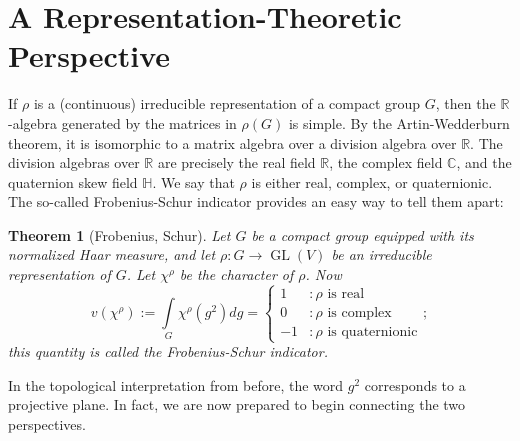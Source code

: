 \documentclass[12pt]{article}
\newtheorem{thm}{Theorem}[section]
\newcommand{\R}{\mathbb{R}}
\newcommand{\C}{\mathbb{C}}
\newcommand{\Hq}{\mathbb{H}}
\newcommand{\Ha}{\mathbb{H}}
\DeclareMathOperator{\End}{End}
\newcommand{\be}{\begin{equation}}
\newcommand{\ee}{\end{equation}}
\DeclareMathOperator{\GL}{GL}
\begin{document}
\section{A Representation-Theoretic Perspective}

If $\rho$ is a (continuous) irreducible representation of a compact group $G$, then the $\R$-algebra generated by the matrices in $\rho(G)$ is simple.  By the Artin-Wedderburn theorem, it is isomorphic to a matrix algebra over a division algebra over $\R$.  The division algebras over $\R$ are precisely the real field $\R$, the complex field $\C$, and the quaternion skew field $\Ha$.  We say that $\rho$ is either real, complex, or quaternionic.  The so-called Frobenius-Schur indicator provides an easy way to tell them apart:

\begin{thm}[Frobenius, Schur]
Let $G$ be a compact group equipped with its normalized Haar measure, and let $\rho : G \to \GL(V)$ be an irreducible representation of $G$. Let $\chi^\rho$ be the character of $\rho$.  Now
\be 
v(\chi^\rho) := \int \limits_G \chi^\rho(g^2) dg  = \left\{
     \begin{array}{ll}
       1  & : \rho \mbox{ is real} \\
       0  & : \rho \mbox{ is complex} \\
       -1 & : \rho \mbox{ is quaternionic}
     \end{array};
   \right.
\ee
this quantity is called the Frobenius-Schur indicator.
\end{thm}
In the topological interpretation from before, the word $g^2$ corresponds to a projective plane.  In fact, we are now prepared to begin connecting the two perspectives.
\end{document}
